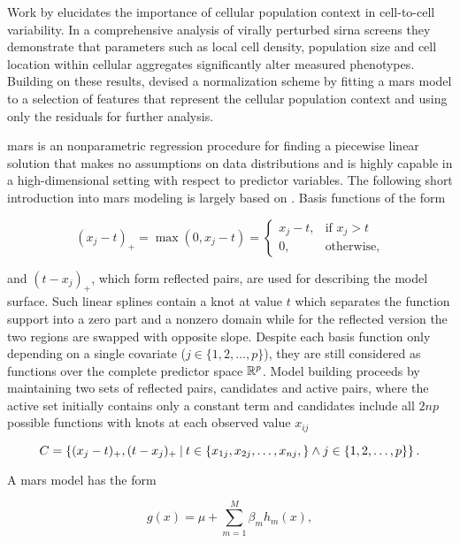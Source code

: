 Work by \citeauthor{Snijder2012} elucidates the importance of cellular population context in cell-to-cell variability. In a comprehensive analysis of virally perturbed \gls{sirna} screens they demonstrate that parameters such as local cell density, population size and cell location within cellular aggregates significantly alter measured phenotypes. Building on these results, \citeauthor{Knapp2011} devised a normalization scheme by fitting a \gls{mars} model to a selection of features that represent the cellular population context and using only the residuals for further analysis.

\Gls{mars} is an nonparametric regression procedure for finding a piecewise linear solution that makes no assumptions on data distributions and is highly capable in a high-dimensional setting with respect to predictor variables. The following short introduction into \gls{mars} modeling is largely based on \cite{Hastie2009}. Basis functions of the form

\begin{equation}
  (x_j-t)_+ = \max(0, x_j-t) =
  \begin{cases}
    x_j-t,& \text{if } x_j > t\\
    0,              & \text{otherwise},
  \end{cases}
\end{equation}

and $(t-x_j)_+$, which form reflected pairs, are used for describing the model surface. Such linear splines contain a knot at value $t$ which separates the function support into a zero part and a nonzero domain while for the reflected version the two regions are swapped with opposite slope. Despite each basis function only depending on a single covariate ($j \in \{1, 2, \dotsc, p\}$), they are still considered as functions over the complete predictor space $\mathbb{R}^p$. Model building proceeds by maintaining two sets of reflected pairs, candidates and active pairs, where the active set initially contains only a constant term and candidates include all $2np$ possible functions with knots at each observed value $x_{ij}$

\begin{equation}
  C = \left\{(x_j-t)_+, (t-x_j)_+ \:\vert\: t\in\{x_{1j}, x_{2j}, \dotsc, x_{nj}, \} \land j\in\{1, 2, \dotsc, p\} \right\}.
\end{equation}

A \gls{mars} model has the form

\begin{equation}
  g(x) = \mu + \sum_{m=1}^M \beta_m h_m(x),
\end{equation}

